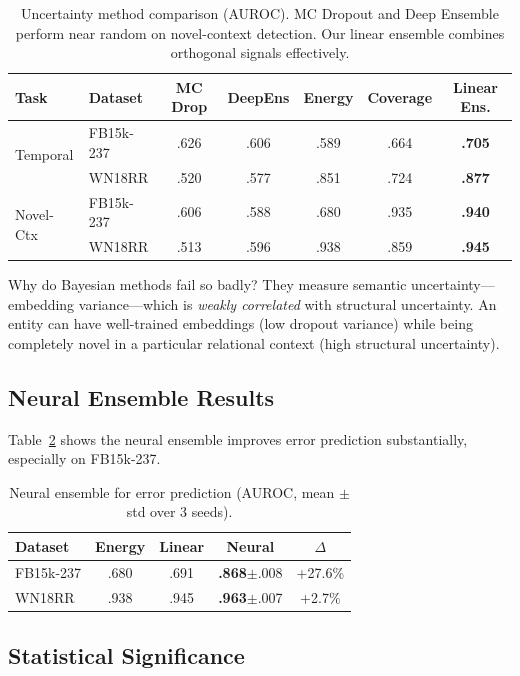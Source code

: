 \documentclass{article}
\begin{document}
\begin{table}[h]
\centering
\caption{Uncertainty method comparison (AUROC). MC Dropout and Deep Ensemble perform near random on novel-context detection. Our linear ensemble combines orthogonal signals effectively.}
\label{tab:baselines}
\begin{tabular}{llccccc}
\toprule
Task & Dataset & MC Drop & DeepEns & Energy & Coverage & \textbf{Linear Ens.} \\
\midrule
\multirow{2}{*}{Temporal}
& FB15k-237 & .626 & .606 & .589 & .664 & \textbf{.705} \\
& WN18RR & .520 & .577 & .851 & .724 & \textbf{.877} \\
\midrule
\multirow{2}{*}{Novel-Ctx}
& FB15k-237 & .606 & .588 & .680 & .935 & \textbf{.940} \\
& WN18RR & .513 & .596 & .938 & .859 & \textbf{.945} \\
\bottomrule
\end{tabular}
\end{table}

Why do Bayesian methods fail so badly?
They measure semantic uncertainty---embedding variance---which is \emph{weakly correlated} with structural uncertainty.
An entity can have well-trained embeddings (low dropout variance) while being completely novel in a particular relational context (high structural uncertainty).

\subsection{Neural Ensemble Results}

Table~\ref{tab:neural} shows the neural ensemble improves error prediction substantially, especially on FB15k-237.

\begin{table}[h]
\centering
\caption{Neural ensemble for error prediction (AUROC, mean $\pm$ std over 3 seeds).}
\label{tab:neural}
\begin{tabular}{lcccc}
\toprule
Dataset & Energy & Linear & Neural & $\Delta$ \\
\midrule
FB15k-237 & .680 & .691 & \textbf{.868}$\pm$.008 & +27.6\% \\
WN18RR & .938 & .945 & \textbf{.963}$\pm$.007 & +2.7\% \\
\bottomrule
\end{tabular}
\end{table}

\subsection{Statistical Significance}
\end{document}
